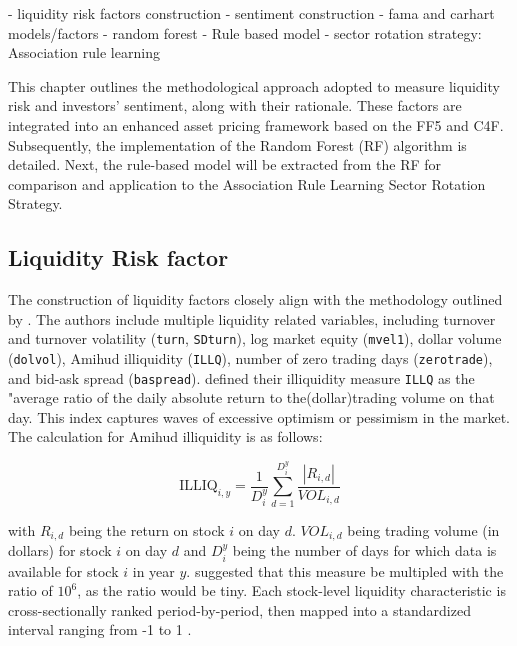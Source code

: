 
- liquidity risk factors construction
- sentiment construction
- fama and carhart models/factors 
- random forest
- Rule based model
- sector rotation strategy: Association rule learning

This chapter outlines the methodological approach adopted to measure liquidity risk and investors' sentiment, along with their rationale. These factors are integrated into an enhanced asset pricing framework based on the FF5 and C4F. Subsequently, the implementation of the Random Forest (RF) algorithm is detailed. Next, the rule-based model will be extracted from the RF for comparison and application to the Association Rule Learning Sector Rotation Strategy.

\subsection{Liquidity Risk factor}
The construction of liquidity factors closely align with the methodology outlined by . The authors include multiple liquidity related variables, including turnover and turnover volatility (\texttt{turn}, \texttt{SDturn}), log market equity (\texttt{mvel1}), dollar volume (\texttt{dolvol}), Amihud illiquidity (\texttt{ILLQ}), number of zero trading days (\texttt{zerotrade}), and bid-ask spread (\texttt{baspread}).  defined their illiquidity measure \texttt{ILLQ} as the "average ratio of the daily absolute return to the(dollar)trading volume on that day. This index captures waves of excessive optimism or pessimism in the market.  The calculation for Amihud illiquidity is as follows:

\begin{equation}
    \label{eq:amihud}
    \text{ILLIQ}_{i,y} = \frac{1}{D_i^y} \sum_{d=1}^{D_i^y} \frac{|R_{i,d}|}{VOL_{i,d}}
\end{equation}
    
with $R_{i,d}$ being the return on stock $i$ on day $d$. $VOL_{i,d}$ being trading volume (in dollars) for stock $i$ on day $d$ and $D_i^{y}$ being the number of days for which data is available for stock $i$ in year $y$.  suggested that this measure be multipled with the ratio of $10^6$, as the ratio would be tiny. Each stock-level liquidity characteristic is cross-sectionally ranked period-by-period, then mapped into a standardized interval ranging from -1 to 1 \cite{gu_2020}. 


